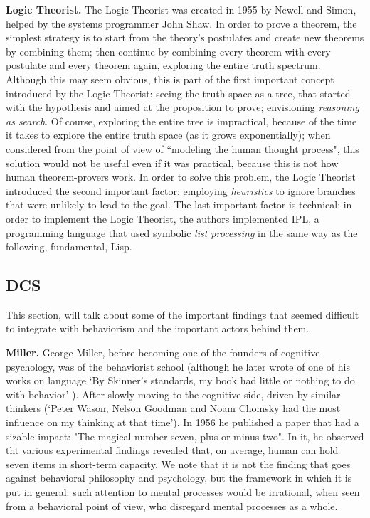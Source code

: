 \documentclass[../main.tex]{subfiles}
\begin{document}
\vspace{4pt}
\textbf{Logic Theorist.}
The Logic Theorist was created in 1955 by Newell and Simon, helped by the systems programmer John Shaw. In order to prove a theorem, the simplest strategy is to start from the theory's postulates and create new theorems by combining them; then continue by combining every theorem with every postulate and every theorem again, exploring the entire truth spectrum. Although this may seem obvious, this is part of the first important concept introduced by the Logic Theorist: seeing the truth space as a tree, that started with the hypothesis and aimed at the proposition to prove; envisioning \textit{reasoning as search}. Of course, exploring the entire tree is impractical, because of the time it takes to explore the entire truth space (as it grows exponentially); when considered from the point of view of ``modeling the human thought process", this solution would not be useful even if it was practical, because this is not how human theorem-provers work. In order to solve this problem, the Logic Theorist introduced the second important factor: employing \textit{heuristics} to ignore branches that were unlikely to lead to the goal. The last important factor is technical: in order to implement the Logic Theorist, the authors implemented IPL, a programming language that used symbolic \textit{list processing} in the same way as the following, fundamental, Lisp.

\subsection{DCS}
This section, will talk about some of the important findings that seemed difficult to integrate with behaviorism and the important actors behind them.

\vspace{4pt}
\textbf{Miller.}
George Miller, before becoming one of the founders of cognitive psychology, was of the behaviorist school (although he later wrote of one of his works on language \enquote*{By Skinner’s standards, my book had little or nothing to do with behavior} \parencite{millerCognitiveRevolutionHistorical2003}). After slowly moving to the cognitive side, driven by similar thinkers (\enquote*{Peter Wason, Nelson Goodman and Noam Chomsky had the most influence on my thinking at that time}). In 1956 he published a paper that had a sizable impact: "The magical number seven, plus or minus two". In it, he observed tht various experimental findings revealed that, on average, human can hold seven items in short-term capacity. We note that it is not the finding that goes against behavioral philosophy and psychology, but the framework in which it is put in general: such attention to mental processes would be irrational, when seen from a behavioral point of view, who disregard mental processes as a whole.
\end{document}
